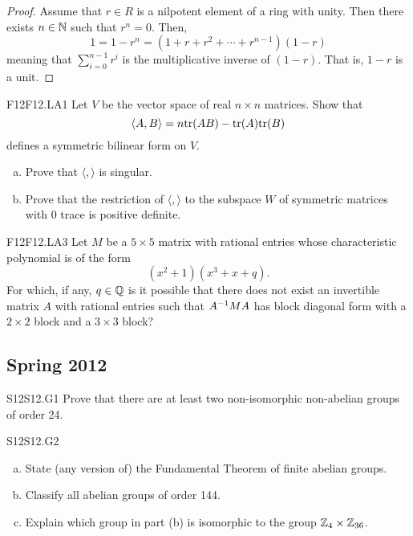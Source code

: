 \documentclass[../AlgebraQualSolutions.tex]{subfiles}
\begin{document}
	\begin{proof}
		Assume that $r \in R$ is a nilpotent element of a ring with unity. Then there exists $n \in \mathbb{N}$ such that $r^n = 0$. Then,
			\[1 = 1 - r^n = (1 + r + r^2 + \cdots + r^{n-1})(1-r)\]
		meaning that $\sum_{i=0}^{n-1}r^i$ is the multiplicative inverse of $(1-r)$. That is, $1-r$ is a unit.
	\end{proof}
	
	\begin{prob}{F12}{F12.LA1}
	Let $V$ be the vector space of real $n \times n$ matrices. Show that 	
		\[\langle A, B \rangle = n \mathrm{tr}(AB) - \mathrm{tr}(A)\mathrm{tr}(B) \]
	defines a symmetric bilinear form on $V$.
	\begin{enumerate}[(a)]
	\item Prove that $\langle,\rangle$ is singular.
	\item Prove that the restriction of $\langle,\rangle$ to the subspace $W$ of symmetric matrices with 0 trace is positive definite.
	\end{enumerate}
	\end{prob}

	\begin{prob}{F12}{F12.LA3}
	Let $M$ be a $5 \times 5$ matrix with rational entries whose characteristic polynomial is of the form
		\[(x^2+1)(x^3+x+q).\]
	For which, if any, $q \in \mathbb{Q}$ is it possible that there does not exist an invertible matrix $A$ with rational entries such that $A^{-1} M A$ has block diagonal form with a $2 \times 2$ block and a $3 \times 3$ block?
	\end{prob}
	
	\subsection{Spring 2012}


	\begin{prob}{S12}{S12.G1}
		Prove that there are at least two non-isomorphic non-abelian groups of order 24.
	\end{prob}

	\begin{prob}{S12}{S12.G2}
		\begin{enumerate}[(a)]
			\item State (any version of) the Fundamental Theorem of finite abelian groups.
			\item Classify all abelian groups of order 144.
			\item Explain which group in part (b) is isomorphic to the group $\mathbb{Z}_4 \times \mathbb{Z}_{36}$.
		\end{enumerate}
	\end{prob}
\end{document}
